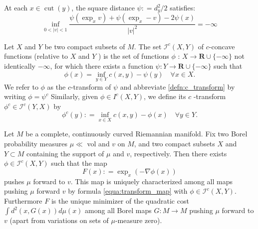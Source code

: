 \begin{prop}
	\label{prop:distance_cut_locus}
	At each \( x \in \operatorname { cut } ( y ) \), the square distance \( \psi : = d _ { y } ^ { 2 } / 2 \) satisfies:
	\[ \inf _ { 0 < | v | < 1 } \frac { \psi \left( \exp _ { x } v \right) + \psi \left( \exp _ { x } - v \right) - 2 \psi ( x ) } { | v | ^ { 2 } } = - \infty \]
\end{prop}
\begin{defn} 
	Let \( X \) and \( Y \) be two compact subsets of \( M \). The set \( \mathcal{I} ^ { c } ( X , Y ) \) of \( c \)-concave functions (relative to \( X \) and \( Y \) ) is the set of functions \( \phi \) : \( X \rightarrow \mathbf { R } \cup \{ - \infty \} \) not identically \( - \infty \), for which there exists a function \( \psi : Y \rightarrow \mathbf { R } \cup \{ - \infty \} \) such that
	\begin{equation}
		\label{defn:c_transform}
		\phi ( x ) = \inf _ { y \in Y } c ( x , y ) - \psi ( y ) \quad \forall x \in X.
	\end{equation}
	We refer to \( \phi \) as the \( c \)-transform of \( \psi \) and abbreviate \cref{defn:c_transform} by writing \( \phi = \psi ^ { c } \)
	Similarly, given \( \phi \in I ^ { c } ( X , Y ) \), we define its \( c \) -transform \( \phi ^ { c } \in \mathcal{I} ^ { c } ( Y , X ) \) by
	\[ \phi ^ { c } ( y ) : = \inf _ { x \in X } c ( x , y ) - \phi ( x ) \quad \forall y \in Y. \]
\end{defn}

\begin{thm}
	\label{thm:optimal_transport_manifold}
	Let \( M \) be a complete, continuously curved Riemannian manifold. Fix two Borel probability measures \( \mu \ll \) vol and \( v \) on \( M \), and two compact subsets \( X \) and \( Y \subset M \) containing the support of \( \mu \) and \( v \), respectively. Then there exists \( \phi \in \mathcal { I } ^ { c } ( X , Y ) \) such that the map
	\begin{equation}
		\label{equa:transform_map}
		F ( x ) : = \exp _ { x } ( - \nabla \phi ( x ) )
	\end{equation}
	pushes \( \mu \) forward to \( v \). This map is uniquely characterized among all maps pushing \( \mu \) forward \( v \) by formula \cref{equa:transform_map} with \( \phi \in \mathcal{I} ^ { c } ( X , Y ) . \) Furthermore \( F \) is the unique minimizer of the quadratic cost \( \int d ^ { 2 } ( x , G ( x ) ) d \mu ( x ) \) among all Borel maps \( G : M \rightarrow M \) pushing \( \mu \) forward to \( v \) (apart from variations on sets of \( \mu \)-measure zero).
\end{thm}

